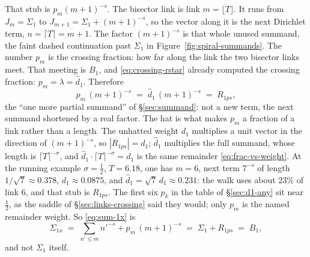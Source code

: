 \documentclass[11pt]{article}
\theoremstyle{definition}
\begin{document}
That stub is \(p_m(m+1)^{-s}\). The bisector link is link
\(m=\lfloor T\rfloor\). It runs from \(J_m=\Sigma_1\) to
\(J_{m+1}=\Sigma_1+(m+1)^{-s}\), so the vector along it is the next Dirichlet
term, \(n=\lceil T\rceil=m+1\). The factor \((m+1)^{-s}\) is that whole
unused summand, the faint dashed continuation past \(\Sigma_1\) in
Figure~\ref{fig:spiral-summands}. The number \(p_m\) is the crossing
fraction: how far along the link the two bisector links meet. That meeting is \(B_1\), and
\eqref{eq:crossing-rstar} already computed the crossing fraction:
\(p_m=\lambda=\hat d_1\). Therefore
\begin{equation}\label{eq:sum-1x-remainder}
p_m\,(m+1)^{-s}
\;=\;
\hat d_1\,(m+1)^{-s}
\;=\;
R_{1ps},
\end{equation}
the ``one more partial summand'' of \S\ref{sec:summand}: not a new term, the
next summand shortened by a real factor. The hat is what makes \(p_m\) a
fraction of a link rather than a length. The unhatted weight \(d_1\)
multiplies a unit vector in the direction of \((m+1)^{-s}\), so
\(|R_{1ps}|=d_1\); \(\hat d_1\) multiplies the full summand, whose length is
\(\lceil T\rceil^{-\sigma}\), and
\(\hat d_1\cdot\lceil T\rceil^{-\sigma}=d_1\) is the same remainder
\eqref{eq:frac-vs-weight}. At the running example \(\sigma=\tfrac12\),
\(T=6.18\), one has \(m=6\), next term \(7^{-s}\) of length
\(1/\sqrt7\approx0.378\), \(d_1\approx0.0875\), and
\(\hat d_1=\sqrt7\,d_1\approx0.231\): the walk uses about \(23\%\) of link
\(6\), and that stub is \(R_{1ps}\). The first six \(p_k\) in the table of
\S\ref{sec:d1-any} sit near \(\tfrac12\), as the saddle of
\S\ref{sec:links-crossing} said they would; only \(p_m\) is the named
remainder weight. So \eqref{eq:sum-1x} is
\begin{equation}\label{eq:sum-1x-B1}
\Sigma_{1x}
\;=\;
\sum_{n'\le m}n'^{-s}+p_m\,(m+1)^{-s}
\;=\;
\Sigma_1+R_{1ps}
\;=\;
B_1,
\end{equation}
and not \(\Sigma_1\) itself.
\end{document}
